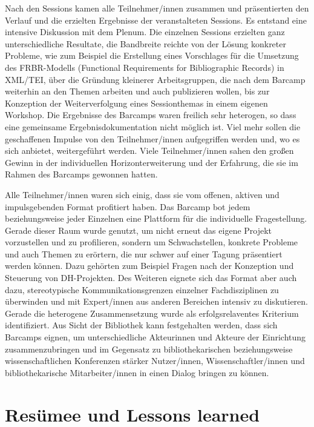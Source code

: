 \documentclass[a4paper,
fontsize=11pt,
oneside,
numbers=noperiodatend,
parskip=half-,
bibliography=totoc,
final
]{scrartcl}
\begin{document}
Nach den Sessions kamen alle Teilnehmer/innen zusammen und präsentierten
den Verlauf und die erzielten Ergebnisse der veranstalteten Sessions. Es
entstand eine intensive Diskussion mit dem Plenum. Die einzelnen
Sessions erzielten ganz unterschiedliche Resultate, die Bandbreite
reichte von der Lösung konkreter Probleme, wie zum Beispiel die
Erstellung eines Vorschlages für die Umsetzung des FRBR-Modells
(Functional Requirements for Bibliographic Records) in XML/TEI, über die
Gründung kleinerer Arbeitsgruppen, die nach dem Barcamp weiterhin an den
Themen arbeiten und auch publizieren wollen, bis zur Konzeption der
Weiterverfolgung eines Sessionthemas in einem eigenen Workshop. Die
Ergebnisse des Barcamps waren freilich sehr heterogen, so dass eine
gemeinsame Ergebnisdokumentation nicht möglich ist. Viel mehr sollen die
geschaffenen Impulse von den Teilnehmer/innen aufgegriffen werden und,
wo es sich anbietet, weitergeführt werden. Viele Teilnehmer/innen sahen
den großen Gewinn in der individuellen Horizonterweiterung und der
Erfahrung, die sie im Rahmen des Barcamps gewonnen hatten.

Alle Teilnehmer/innen waren sich einig, dass sie vom offenen, aktiven
und impulsgebenden Format profitiert haben. Das Barcamp bot jedem
beziehungsweise jeder Einzelnen eine Plattform für die individuelle
Fragestellung. Gerade dieser Raum wurde genutzt, um nicht erneut das
eigene Projekt vorzustellen und zu profilieren, sondern um
Schwachstellen, konkrete Probleme und auch Themen zu erörtern, die nur
schwer auf einer Tagung präsentiert werden können. Dazu gehörten zum
Beispiel Fragen nach der Konzeption und Steuerung von DH-Projekten. Des
Weiteren eignete sich das Format aber auch dazu, stereotypische
Kommunikationsgrenzen einzelner Fachdisziplinen zu überwinden und mit
Expert/innen aus anderen Bereichen intensiv zu diskutieren. Gerade die
heterogene Zusammensetzung wurde als erfolgsrelaventes Kriterium
identifiziert. Aus Sicht der Bibliothek kann festgehalten werden, dass
sich Barcamps eignen, um unterschiedliche Akteurinnen und Akteure der
Einrichtung zusammenzubringen und im Gegensatz zu bibliothekarischen
beziehungsweise wissenschaftlichen Konferenzen stärker Nutzer/innen,
Wissenschaftler/innen und bibliothekarische Mitarbeiter/innen in einen
Dialog bringen zu können.

\section{Resümee und Lessons
learned}\label{resumee-und-lessons-learned}
\end{document}
